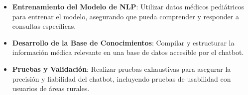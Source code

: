 \begin{itemize}
    \item \textbf{Entrenamiento del Modelo de NLP}: Utilizar datos médicos pediátricos para entrenar el modelo, asegurando que pueda comprender y responder a consultas específicas.
    \item \textbf{Desarrollo de la Base de Conocimientos}: Compilar y estructurar la información médica relevante en una base de datos accesible por el chatbot.
    \item \textbf{Pruebas y Validación}: Realizar pruebas exhaustivas para asegurar la precisión y fiabilidad del chatbot, incluyendo pruebas de usabilidad con usuarios de áreas rurales.
\end{itemize}
%
%
